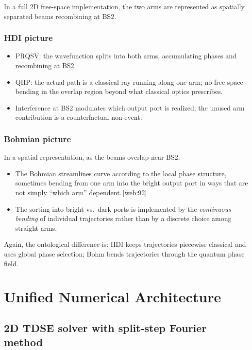 \documentclass[11pt]{article}
\begin{document}
In a full 2D free-space implementation, the two arms are represented as spatially separated beams recombining at BS2.

\subsubsection{HDI picture}

\begin{itemize}[leftmargin=*]
  \item PRQSV: the wavefunction splits into both arms, accumulating phases and recombining at BS2.
  \item QHP: the actual path is a classical ray running along one arm; no free-space bending in the overlap region beyond what classical optics prescribes.
  \item Interference at BS2 modulates which output port is realized; the unused arm contribution is a counterfactual non-event.
\end{itemize}

\subsubsection{Bohmian picture}

In a spatial representation, as the beams overlap near BS2:

\begin{itemize}[leftmargin=*]
  \item The Bohmian streamlines curve according to the local phase structure, sometimes bending from one arm into the bright output port in ways that are not simply ``which arm'' dependent.\,[web:92]
  \item The sorting into bright vs.\ dark ports is implemented by the \emph{continuous bending} of individual trajectories rather than by a discrete choice among straight arms.
\end{itemize}

Again, the ontological difference is: HDI keeps trajectories piecewise classical and uses global phase selection; Bohm bends trajectories through the quantum phase field.

\section{Unified Numerical Architecture}

\subsection{2D TDSE solver with split-step Fourier method}
\end{document}
